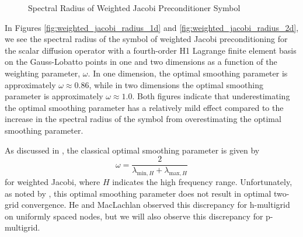 \begin{figure}[!ht]
  \centering
  \hfill
  \caption{Spectral Radius of Weighted Jacobi Preconditioner Symbol}
\end{figure}

In Figures \ref{fig:weighted_jacobi_radius_1d} and \ref{fig:weighted_jacobi_radius_2d}, we see the spectral radius of the symbol of weighted Jacobi preconditioning for the scalar diffusion operator with a fourth-order H1 Lagrange finite element basis on the Gauss-Lobatto points in one and two dimensions as a function of the weighting parameter, $\omega$.
In one dimension, the optimal smoothing parameter is approximately $\omega \approx 0.86$, while in two dimensions the optimal smoothing parameter is approximately $\omega \approx 1.0$.
Both figures indicate that underestimating the optimal smoothing parameter has a relatively mild effect compared to the increase in the spectral radius of the symbol from overestimating the optimal smoothing parameter.

As discussed in \cite{he2020two}, the classical optimal smoothing parameter is given by
\begin{equation}
\omega = \frac{2}{\lambda_{\text{min}, H} + \lambda_{\text{max}, H}}
\end{equation}
for weighted Jacobi, where $H$ indicates the high frequency range.
Unfortunately, as noted by \cite{he2020two}, this optimal smoothing parameter does not result in optimal two-grid convergence.
He and MacLachlan observed this discrepancy for h-multigrid on uniformly spaced nodes, but we will also observe this discrepancy for p-multigrid.

